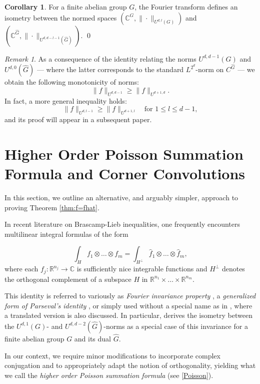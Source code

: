 \documentclass{amsart}
\theoremstyle{definition}
\newtheorem{corollary}[theorem]{Corollary}
\theoremstyle{remark}
\newtheorem{remark}[theorem]{Remark}
\numberwithin{equation}{section}
\begin{document}
\begin{corollary} For a finite abelian group $G$, the Fourier transform defines an isometry between the normed spaces  $(\mathbb{C}^G, \|\cdot\|_{U^{d,l}(G)})$ and  $(\mathbb{C}^{\widehat{G}},\|\cdot\|_{U^{d,d-l-1}(\widehat{G})})$.    \qed 
\end{corollary}


\begin{remark}
    As a consequence of the identity relating the norms $U^{d,d-1}(G)$ and $U^{d,0}(\hat G)$ --- where the latter corresponds to the standard $L^{2^d}$-norm on $C^{\hat{G}}$ --- we obtain the following monotonicity of norms:
$$ \|f\|_{U^{d,d-1}} \ge \|f\|_{U^{d+1,d}}.$$ 
In fact, a more general inequality holds: 
$$ \|f\|_{U^{d,l-1}} \ge \|f\|_{U^{d+1,l}} \quad \text{for } 1 \le l \le  d-1, $$ 
and its proof will appear in a subsequent paper.
        
\end{remark}


\section{Higher Order Poisson Summation Formula and Corner Convolutions} %
\label{sec:Poisson}

In this section, we outline an alternative, and arguably simpler, approach to proving Theorem \ref{thm:f=fhat}.

In recent literature on Brascamp-Lieb inequalities, one frequently  encounters multilinear integral formulas of the form 

\[ \int_H f_1 \otimes \dots \otimes f_m = \int_{H^\perp} \widehat{f}_1 \otimes \dots \otimes \widehat{f}_m,\]
where each $f_j : \mathbb{R}^{n_j} \to \mathbb{C}$ is sufficiently nice integrable functions and $H^\perp$ denotes the orthogonal complement of a subspace $H$ in $\mathbb{R}^{n_1} \times \dots \times \mathbb{R}^{n_m}$. 

This identity is referred to variously as \textit{Fourier invariance property} \cite{BenJeon20, BenBez22}, a \textit{generalized form of Parseval's identity} \cite{BenBez20}, or simply used without a special name as in \cite{DurThie21}, where a translated version is also discussed. In particular, \cite{BenJeon20} derives the isometry between the $U^{d,1}(G)$- and $U^{d,d-2}(\widehat{G})$-norms as a special case of this invariance for a finite abelian group $G$ and its dual $\widehat{G}$. 

In our context, we require minor modifications to incorporate complex conjugation and to appropriately adapt the notion of orthogonality, yielding what we call the \textit{higher order Poisson summation formula} (see \eqref{Poisson}). 
\end{document}

